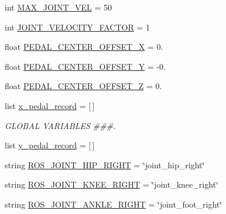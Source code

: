 \begin{DoxyCompactItemize}
int \mbox{\hyperlink{namespacepedal__simulation__interpolation__cubic__derivative_a79dd90d8e01df7b26eb98b2af65f2dee}{M\+A\+X\+\_\+\+J\+O\+I\+N\+T\+\_\+\+V\+EL}} = 50
\item 
int \mbox{\hyperlink{namespacepedal__simulation__interpolation__cubic__derivative_aacc5dbcfea4d8101bbb33668b9557625}{J\+O\+I\+N\+T\+\_\+\+V\+E\+L\+O\+C\+I\+T\+Y\+\_\+\+F\+A\+C\+T\+OR}} = 1
\item 
float \mbox{\hyperlink{namespacepedal__simulation__interpolation__cubic__derivative_a2b3980e4612b64ca1859deec1eea428a}{P\+E\+D\+A\+L\+\_\+\+C\+E\+N\+T\+E\+R\+\_\+\+O\+F\+F\+S\+E\+T\+\_\+X}} = 0.
\item 
float \mbox{\hyperlink{namespacepedal__simulation__interpolation__cubic__derivative_a2bfa0ad4dbbe7114dca00aeea126663f}{P\+E\+D\+A\+L\+\_\+\+C\+E\+N\+T\+E\+R\+\_\+\+O\+F\+F\+S\+E\+T\+\_\+Y}} = -\/0.
\item 
float \mbox{\hyperlink{namespacepedal__simulation__interpolation__cubic__derivative_afeff8e75c707e34c08ef81847545421e}{P\+E\+D\+A\+L\+\_\+\+C\+E\+N\+T\+E\+R\+\_\+\+O\+F\+F\+S\+E\+T\+\_\+Z}} = 0.
\item 
list \mbox{\hyperlink{namespacepedal__simulation__interpolation__cubic__derivative_a15cdfa21f373ce0948d66b64f98eae22}{x\+\_\+pedal\+\_\+record}} = \mbox{[}$\,$\mbox{]}
\begin{DoxyCompactList}\small\item\em G\+L\+O\+B\+AL V\+A\+R\+I\+A\+B\+L\+ES \#\#\#. \end{DoxyCompactList}\item 
list \mbox{\hyperlink{namespacepedal__simulation__interpolation__cubic__derivative_a237b936a014f1444eea759e6081f5d4f}{y\+\_\+pedal\+\_\+record}} = \mbox{[}$\,$\mbox{]}
\item 
string \mbox{\hyperlink{namespacepedal__simulation__interpolation__cubic__derivative_aa6d7a9892d82d31f98321841f5682f02}{R\+O\+S\+\_\+\+J\+O\+I\+N\+T\+\_\+\+H\+I\+P\+\_\+\+R\+I\+G\+HT}} = \char`\"{}joint\+\_\+hip\+\_\+right\char`\"{}
\item 
string \mbox{\hyperlink{namespacepedal__simulation__interpolation__cubic__derivative_a2cf09e42ef98b38f9f321007cc4d1040}{R\+O\+S\+\_\+\+J\+O\+I\+N\+T\+\_\+\+K\+N\+E\+E\+\_\+\+R\+I\+G\+HT}} = \char`\"{}joint\+\_\+knee\+\_\+right\char`\"{}
\item 
string \mbox{\hyperlink{namespacepedal__simulation__interpolation__cubic__derivative_a6f9c7c09e4cedc7a787240de28dcc011}{R\+O\+S\+\_\+\+J\+O\+I\+N\+T\+\_\+\+A\+N\+K\+L\+E\+\_\+\+R\+I\+G\+HT}} = \char`\"{}joint\+\_\+foot\+\_\+right\char`\"{}

\end{DoxyCompactItemize}
